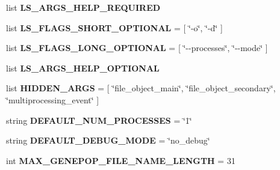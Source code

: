 \begin{DoxyCompactItemize}
\item 
list {\bfseries L\+S\+\_\+\+A\+R\+G\+S\+\_\+\+H\+E\+L\+P\+\_\+\+R\+E\+Q\+U\+I\+R\+ED}\hypertarget{namespacenegui_1_1pgdriveneestimator_a52b60d12ffe6a87aacf57d1d6ef98cba}{}\label{namespacenegui_1_1pgdriveneestimator_a52b60d12ffe6a87aacf57d1d6ef98cba}

\item 
list {\bfseries L\+S\+\_\+\+F\+L\+A\+G\+S\+\_\+\+S\+H\+O\+R\+T\+\_\+\+O\+P\+T\+I\+O\+N\+AL} = \mbox{[} \char`\"{}-\/o\char`\"{}, \char`\"{}-\/d\char`\"{} \mbox{]}\hypertarget{namespacenegui_1_1pgdriveneestimator_a9faf32e01452fe45ae54a6462c39a5af}{}\label{namespacenegui_1_1pgdriveneestimator_a9faf32e01452fe45ae54a6462c39a5af}

\item 
list {\bfseries L\+S\+\_\+\+F\+L\+A\+G\+S\+\_\+\+L\+O\+N\+G\+\_\+\+O\+P\+T\+I\+O\+N\+AL} = \mbox{[} \char`\"{}-\/-\/processes\char`\"{}, \char`\"{}-\/-\/mode\char`\"{} \mbox{]}\hypertarget{namespacenegui_1_1pgdriveneestimator_a4c3f7a4b71a9b4887adc55f489cc4ace}{}\label{namespacenegui_1_1pgdriveneestimator_a4c3f7a4b71a9b4887adc55f489cc4ace}

\item 
list {\bfseries L\+S\+\_\+\+A\+R\+G\+S\+\_\+\+H\+E\+L\+P\+\_\+\+O\+P\+T\+I\+O\+N\+AL}
\item 
list {\bfseries H\+I\+D\+D\+E\+N\+\_\+\+A\+R\+GS} = \mbox{[} \char`\"{}file\+\_\+object\+\_\+main\char`\"{}, \char`\"{}file\+\_\+object\+\_\+secondary\char`\"{}, \char`\"{}multiprocessing\+\_\+event\char`\"{} \mbox{]}\hypertarget{namespacenegui_1_1pgdriveneestimator_a6fd954e84a4eb8eeb2a1a63e5f53c716}{}\label{namespacenegui_1_1pgdriveneestimator_a6fd954e84a4eb8eeb2a1a63e5f53c716}

\item 
string {\bfseries D\+E\+F\+A\+U\+L\+T\+\_\+\+N\+U\+M\+\_\+\+P\+R\+O\+C\+E\+S\+S\+ES} = \char`\"{}1\char`\"{}\hypertarget{namespacenegui_1_1pgdriveneestimator_a2e948c0ce60271c8e6e3b08edb453839}{}\label{namespacenegui_1_1pgdriveneestimator_a2e948c0ce60271c8e6e3b08edb453839}

\item 
string {\bfseries D\+E\+F\+A\+U\+L\+T\+\_\+\+D\+E\+B\+U\+G\+\_\+\+M\+O\+DE} = \char`\"{}no\+\_\+debug\char`\"{}\hypertarget{namespacenegui_1_1pgdriveneestimator_af83e46ff34683de5b4e27783ac68425f}{}\label{namespacenegui_1_1pgdriveneestimator_af83e46ff34683de5b4e27783ac68425f}

\item 
int {\bfseries M\+A\+X\+\_\+\+G\+E\+N\+E\+P\+O\+P\+\_\+\+F\+I\+L\+E\+\_\+\+N\+A\+M\+E\+\_\+\+L\+E\+N\+G\+TH} = 31\hypertarget{namespacenegui_1_1pgdriveneestimator_aaaca09e92573315d60360d27b83338ee}{}\label{namespacenegui_1_1pgdriveneestimator_aaaca09e92573315d60360d27b83338ee}


\end{DoxyCompactItemize}
